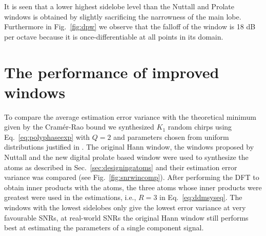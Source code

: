 \documentclass[twoside,a4paper]{article}
\begin{document}
It is seen that a lower highest sidelobe level than the Nuttall and Prolate
windows is obtained by slightly sacrificing the narrowness of the main lobe. Furthermore in
Fig.~\ref{fig:dpw} we observe that the falloff of the window is 18 dB per octave
because it is once-differentiable at all points in its domain.

\section{The performance of improved windows}

To compare the average estimation error variance with the
theoretical minimum given by the Cram\'{e}r-Rao bound we synthesized $K_{1}$ random
chirps using Eq.~\ref{eq:polyphaseexp}
with $Q=2$ and parameters chosen from uniform distributions justified in
\cite{betser2009sinusoidal}. The original Hann window,
the windows proposed by Nuttall and the new digital prolate based window were
used to synthesize the atoms as described in Sec.~\ref{sec:designingatoms} and
their estimation error variance was compared (see
Fig.~\ref{fig:snrwincomp}). After performing the DFT to obtain inner products
with the atoms, the three atoms whose inner products were greatest were used in
the estimations, i.e., $R=3$ in Eq.~\ref{eq:ddmsyseq}. The windows with the
lowest sidelobes only give the lowest error variance at very favourable SNRs, at
real-world SNRs the original Hann window still performs best at estimating the
parameters of a single component signal.

\end{document}
